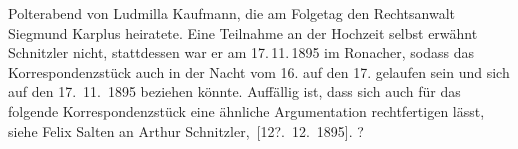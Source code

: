 \begin{ledgroupsized}[t]{13cm}
{{{                     Polterabend von Ludmilla Kaufmann, die
                     am Folgetag 
                     den Rechtsanwalt Siegmund Karplus
                     heiratete. Eine Teilnahme an der Hochzeit selbst erwähnt Schnitzler nicht, stattdessen 
                     war er am 17. 11. 1895 im Ronacher, sodass das Korrespondenzstück auch in der Nacht vom 16. auf den 17. gelaufen sein 
                     und sich auf den 17. 11. 1895 beziehen könnte. Auffällig ist, dass sich auch für das folgende
                     Korrespondenzstück eine ähnliche Argumentation rechtfertigen lässt, siehe Felix Salten an Arthur Schnitzler, [12?. 12. 1895].
                  }}}\label{K_L03166-3h}?\pend
           
         
         \endnumbering{}\end{ledgroupsized}  \newcommand{\dateiname}{L03166}\newcommand{\titel}{Felix Salten an Arthur Schnitzler, [16. 11. 1895]}\newcommand{\editorInnen}{Martin Anton Müller und Laura Untner}
      